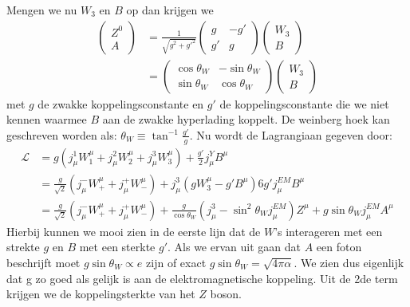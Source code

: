 \documentclass[../main.tex]{subfiles}
\begin{document}
Mengen we nu $W_3$ en $B$ op dan krijgen we 
\begin{equation}
    \begin{aligned}
        \label{eq:w_b_mixing}
        \begin{pmatrix}
            Z^0\\
            A
        \end{pmatrix}
        &= \frac{1}{\sqrt{g^2+g'^2}} 
        \begin{pmatrix}
            g & -g'\\
            g' & g
        \end{pmatrix}
        \begin{pmatrix}
            W_3\\
            B
        \end{pmatrix}\\
        &=
        \begin{pmatrix}
            \cos\theta_W & -\sin\theta_W\\
            \sin\theta_W & \cos\theta_W
        \end{pmatrix}
        \begin{pmatrix}
            W_3\\
            B
        \end{pmatrix}
    \end{aligned}
\end{equation}
met $g$ de zwakke koppelingsconstante en $g'$ de koppelingsconstante die we niet kennen waarmee $B$ aan de zwakke hyperlading koppelt. De weinberg hoek kan geschreven worden als: $\theta_W\equiv \tan^{-1} \frac{g'}{g}$. Nu wordt de Lagrangiaan gegeven door:
\begin{equation}
    \begin{aligned}
        \label{eq:elektozwakke_lagrangiaan}
        \mathcal{L} &= g(j_\mu^1W_1^\mu+j_\mu^2W_2^\mu+j_\mu^3W_3^\mu)+ \frac{g'}{2} j_\mu^YB^\mu\\
                    &= \frac{g}{\sqrt{2}} (j_\mu^-W_+^\mu+j_\mu^+W_-^\mu) + j_\mu^3(gW_3^\mu-g'B^\mu) 6 g'j_\mu^{EM}B^\mu\\
                    &= \frac{g}{\sqrt{2}} (j_\mu^-W_+^\mu+j_\mu^+W_-^\mu) + \frac{g}{\cos\theta_W} (j_\mu^3 - \sin^2\theta_Wj_\mu^{EM})Z^\mu + g\sin\theta_Wj_\mu^{EM}A^\mu
    \end{aligned}
\end{equation}
Hierbij kunnen we mooi zien in de eerste lijn dat de $W$'s interageren met een strekte $g$ en $B$ met een sterkte $g'$. Als we ervan uit gaan dat $A$ een foton beschrijft moet $g\sin\theta_W \propto e$ zijn of exact $g\sin\theta_W = \sqrt{4\pi\alpha}$. We zien dus eigenlijk dat g zo  goed als gelijk is aan de elektromagnetische koppeling. Uit de 2de term krijgen we de koppelingsterkte van het $Z$ boson.
\end{document}
